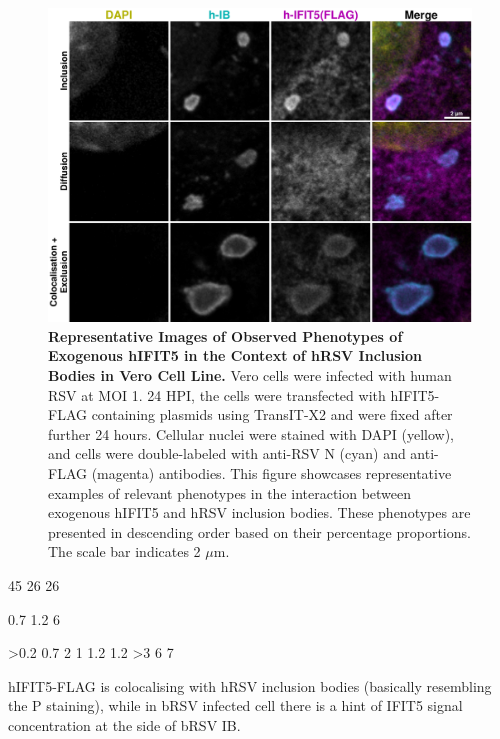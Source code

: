 \begin{figure}
    \centering
    \includegraphics[width=1\linewidth]{09. Chapter 4/Figs/02. Overexpression/04. IFIT5/03. i5-hrsv.pdf}
    \caption[Representative Images of Observed Phenotypes of Exogenous hIFIT5 in the Context of hRSV Inclusion Bodies in Vero Cell Line.]{\textbf{Representative Images of Observed Phenotypes of Exogenous hIFIT5 in the Context of hRSV Inclusion Bodies in Vero Cell Line.} Vero cells were infected with human RSV at MOI 1. 24 HPI, the cells were transfected with hIFIT5-FLAG containing plasmids using TransIT-X2 and were fixed after further 24 hours. Cellular nuclei were stained with DAPI (yellow), and cells were double-labeled with anti-RSV N (cyan) and anti-FLAG (magenta) antibodies. This figure showcases representative examples of relevant phenotypes in the interaction between exogenous hIFIT5 and hRSV inclusion bodies. These phenotypes are presented in descending order based on their percentage proportions. The scale bar indicates 2 \(\mu \mbox{m}\).}
    \label{fig:Representative Images of Observed Phenotypes of Exogenous hIFIT5 in the Context of hRSV Inclusion Bodies in VERO Cell Line}
\end{figure}

45 26 26

0.7 1.2 6

>0.2 0.7 2
1 1.2 1.2
>3 6 7


hIFIT5-FLAG is colocalising with hRSV inclusion bodies (basically resembling the P staining), while in bRSV infected cell there is a hint of IFIT5 signal concentration at the side of bRSV IB.

